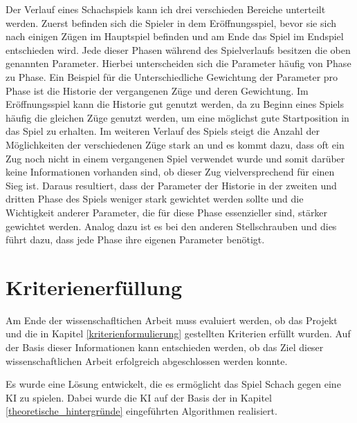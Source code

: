 Der Verlauf eines Schachspiels kann ich drei verschieden Bereiche unterteilt werden. Zuerst befinden sich die Spieler in dem Eröffnungsspiel, bevor sie sich nach einigen Zügen im Hauptspiel befinden und am Ende das Spiel im Endspiel entschieden wird. Jede dieser Phasen während des Spielverlaufs besitzen die oben genannten Parameter. Hierbei unterscheiden sich die Parameter häufig von Phase zu Phase. Ein Beispiel für die Unterschiedliche Gewichtung der Parameter pro Phase ist die Historie der vergangenen Züge und deren Gewichtung. Im Eröffnungsspiel kann die Historie gut genutzt werden, da zu Beginn eines Spiels häufig die gleichen Züge genutzt werden, um eine möglichst gute Startposition in das Spiel zu erhalten. Im weiteren Verlauf des Spiels steigt die Anzahl der Möglichkeiten der verschiedenen Züge stark an und es kommt dazu, dass oft ein Zug noch nicht in einem vergangenen Spiel verwendet wurde und somit darüber keine Informationen vorhanden sind, ob dieser Zug vielversprechend für einen Sieg ist. Daraus resultiert, dass der Parameter der Historie in der zweiten und dritten Phase des Spiels weniger stark gewichtet werden sollte und die Wichtigkeit anderer Parameter, die für diese Phase essenzieller sind, stärker gewichtet werden. Analog dazu ist es bei den anderen Stellschrauben und dies führt dazu, dass jede Phase ihre eigenen Parameter benötigt. 



\section{Kriterienerfüllung}
Am Ende der wissenschafltichen Arbeit muss evaluiert werden, ob das Projekt und die in Kapitel \ref{kriterienformulierung} gestellten Kriterien erfüllt wurden. Auf der Basis dieser Informationen kann entschieden werden, ob das Ziel dieser wissenschaftlichen Arbeit erfolgreich abgeschlossen werden konnte.

Es wurde eine Lösung entwickelt, die es ermöglicht das Spiel Schach gegen eine KI zu spielen. Dabei wurde die KI auf der Basis der in Kapitel \ref{theoretische_hintergründe} eingeführten Algorithmen realisiert.

